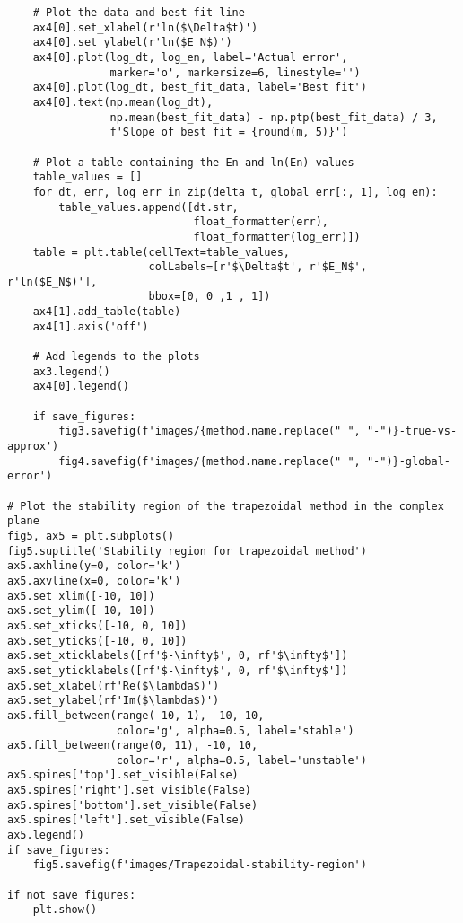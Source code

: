 \documentclass{article}
\begin{document}
\begin{verbatim}
    # Plot the data and best fit line
    ax4[0].set_xlabel(r'ln($\Delta$t)')
    ax4[0].set_ylabel(r'ln($E_N$)')
    ax4[0].plot(log_dt, log_en, label='Actual error',
                marker='o', markersize=6, linestyle='')
    ax4[0].plot(log_dt, best_fit_data, label='Best fit')
    ax4[0].text(np.mean(log_dt),
                np.mean(best_fit_data) - np.ptp(best_fit_data) / 3,
                f'Slope of best fit = {round(m, 5)}')

    # Plot a table containing the En and ln(En) values
    table_values = []
    for dt, err, log_err in zip(delta_t, global_err[:, 1], log_en):
        table_values.append([dt.str,
                             float_formatter(err),
                             float_formatter(log_err)])
    table = plt.table(cellText=table_values,
                      colLabels=[r'$\Delta$t', r'$E_N$', r'ln($E_N$)'],
                      bbox=[0, 0 ,1 , 1])
    ax4[1].add_table(table)
    ax4[1].axis('off')

    # Add legends to the plots
    ax3.legend()
    ax4[0].legend()

    if save_figures:
        fig3.savefig(f'images/{method.name.replace(" ", "-")}-true-vs-approx')
        fig4.savefig(f'images/{method.name.replace(" ", "-")}-global-error')

# Plot the stability region of the trapezoidal method in the complex plane
fig5, ax5 = plt.subplots()
fig5.suptitle('Stability region for trapezoidal method')
ax5.axhline(y=0, color='k')
ax5.axvline(x=0, color='k')
ax5.set_xlim([-10, 10])
ax5.set_ylim([-10, 10])
ax5.set_xticks([-10, 0, 10])
ax5.set_yticks([-10, 0, 10])
ax5.set_xticklabels([rf'$-\infty$', 0, rf'$\infty$'])
ax5.set_yticklabels([rf'$-\infty$', 0, rf'$\infty$'])
ax5.set_xlabel(rf'Re($\lambda$)')
ax5.set_ylabel(rf'Im($\lambda$)')
ax5.fill_between(range(-10, 1), -10, 10,
                 color='g', alpha=0.5, label='stable')
ax5.fill_between(range(0, 11), -10, 10,
                 color='r', alpha=0.5, label='unstable')
ax5.spines['top'].set_visible(False)
ax5.spines['right'].set_visible(False)
ax5.spines['bottom'].set_visible(False)
ax5.spines['left'].set_visible(False)
ax5.legend()
if save_figures:
    fig5.savefig(f'images/Trapezoidal-stability-region')

if not save_figures:
    plt.show()
\end{verbatim}
\end{document}
